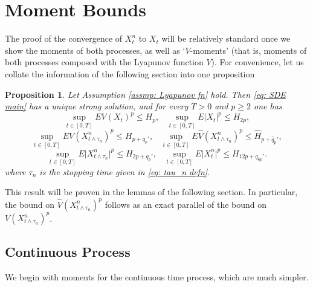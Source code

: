 \documentclass{article}
\newtheorem{prop}{Proposition}
\begin{document}
\section{Moment Bounds}
The proof of the convergence of $X^n_t$ to $X_t$ will be relatively standard once we show the moments of both processes, as well as `$V$-moments' (that is, moments of both processes composed with the Lyapunov function $V$). For convenience, let us collate the information of the following section into one proposition
\begin{prop}\label{prop: mom bounds}
    Let Assumption \ref{assmp: Lyapunov fn} hold.  Then \eqref{eq: SDE main} has a unique strong solution, and for every $T>0$ and $p\geq 2$ one has
    \begin{equation}
        \sup_{t\in [0,T]} EV(X_t)^p\leq H_p,\;\;\; \sup_{t\in [0,T]}  E\lvert X_t \rvert ^p\leq H_{2p},
    \end{equation}
\begin{equation}
    \sup_{t\in [0,T]}EV(X^n_{t\wedge \tau_n} )^p\leq H_{p+q_p'},\;\;\;\sup_{t\in [0,T]}E\hat{V}(X^n_{t\wedge \tau_n} )^p\leq \hat{H}_{p+\hat{q}_p'},
\end{equation}
    \begin{equation}
     \sup_{t\in [0,T]} E\lvert X^n_{t\wedge \tau_n} \rvert^p\leq H_{2p+q_p'},\;\;\; \sup_{t\in [0,T]} E\lvert X^n_t \rvert^p\leq H_{12p+q_{6p}'}.
    \end{equation}
    where $\tau_n$ is the stopping time given in \eqref{eq: tau_n defn}.
\end{prop}
This result will be proven in the lemmas of the following section. In particular, the bound on $\hat{V}(X^n_{t\wedge \tau_n} )^p$ follows as an exact parallel of the bound on $V(X^n_{t\wedge \tau_n} )^p$.



\subsection{Continuous Process}
We begin with moments for the continuous time process, which are much simpler.
\end{document}
